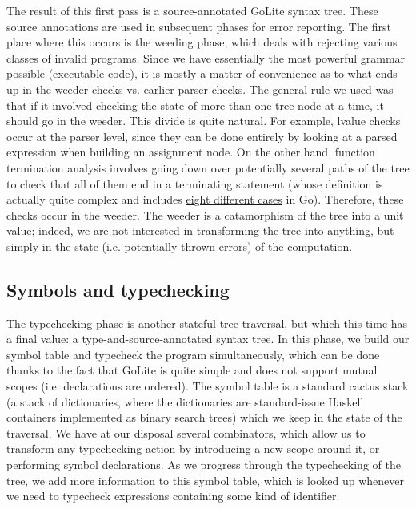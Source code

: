 \documentclass[letterpaper,11pt]{article}
\begin{document}
The result of this first pass is a source-annotated GoLite syntax tree. These source annotations are used in subsequent phases for error reporting. The first place where this occurs is the weeding phase, which deals with rejecting various classes of invalid programs. Since we have essentially the most powerful grammar possible (executable code), it is mostly a matter of convenience as to what ends up in the weeder checks vs. earlier parser checks. The general rule we used was that if it involved checking the state of more than one tree node at a time, it should go in the weeder. This divide is quite natural. For example, lvalue checks occur at the parser level, since they can be done entirely by looking at a parsed expression when building an assignment node. On the other hand, function termination analysis involves going down over potentially several paths of the tree to check that all of them end in a terminating statement (whose definition is actually quite complex and includes \href{https://golang.org/ref/spec#Terminating_statements}{eight different cases} in Go). Therefore, these checks occur in the weeder. The weeder is a catamorphism of the tree into a unit value; indeed, we are not interested in transforming the tree into anything, but simply in the state (i.e. potentially thrown errors) of the computation.

\subsection{Symbols and typechecking}
\label{sec:ph_type}

The typechecking phase is another stateful tree traversal, but which this time has a final value: a type-and-source-annotated syntax tree. In this phase, we build our symbol table and typecheck the program simultaneously, which can be done thanks to the fact that GoLite is quite simple and does not support mutual scopes (i.e. declarations are ordered). The symbol table is a standard cactus stack (a stack of dictionaries, where the dictionaries are standard-issue Haskell containers implemented as binary search trees) which we keep in the state of the traversal. We have at our disposal several combinators, which allow us to transform any typechecking action by introducing a new scope around it, or performing symbol declarations. As we progress through the typechecking of the tree, we add more information to this symbol table, which is looked up whenever we need to typecheck expressions containing some kind of identifier.
\end{document}
